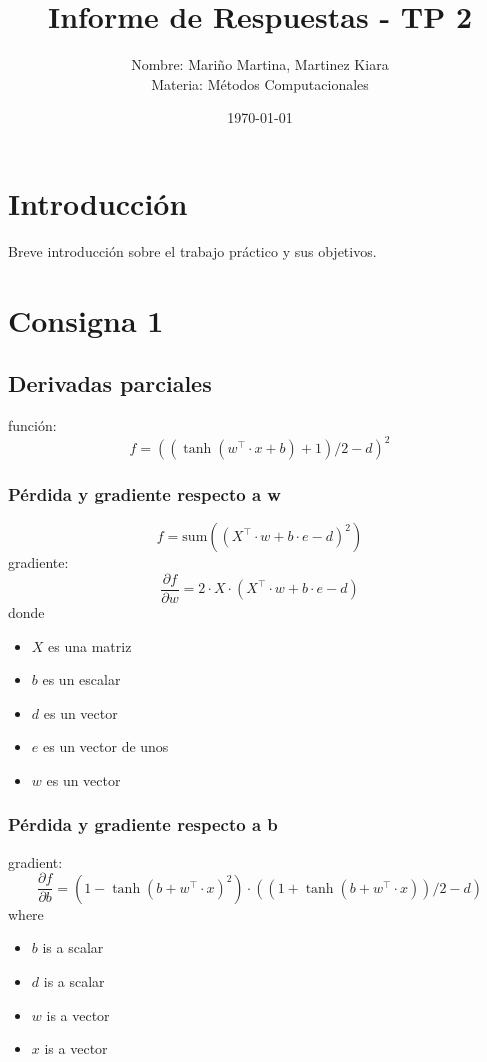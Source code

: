 \documentclass[a4paper,12pt]{article}
\title{Informe de Respuestas - TP 2}
\author{Nombre: Mariño Martina, Martinez Kiara \\
Materia: Métodos Computacionales}
\date{\today}
\begin{document}
\maketitle
\thispagestyle{empty}
\newpage

\tableofcontents
\newpage

\section{Introducción}
Breve introducción sobre el trabajo práctico y sus objetivos.

\section{Consigna 1}
\subsection{Derivadas parciales}
función:
\[
  f = ((\tanh(w^\top \cdot x+b)+1)/2-d)^{2}
\]
\subsubsection{Pérdida y gradiente respecto a w}
\[
  f = \mathrm{sum}((X^\top \cdot w+b\cdot e-d)^{2})
\]
gradiente:
\[
  \frac{\partial f}{\partial w} = 2\cdot X\cdot (X^\top \cdot w+b\cdot e-d)
\]
donde
\begin{itemize}
  \item $X$ es una matriz
  \item $b$ es un escalar
  \item $d$ es un vector
  \item $e$ es un vector de unos
  \item $w$ es un vector
\end{itemize}
\subsubsection{Pérdida y gradiente respecto a b}
gradient:
\[
  \frac{\partial f}{\partial b} = (1-\tanh(b+w^\top \cdot x)^{2})\cdot ((1+\tanh(b+w^\top \cdot x))/2-d)
\]
where
\begin{itemize}
  \item $b$ is a scalar
  \item $d$ is a scalar
  \item $w$ is a vector
  \item $x$ is a vector
\end{itemize}
\end{document}
